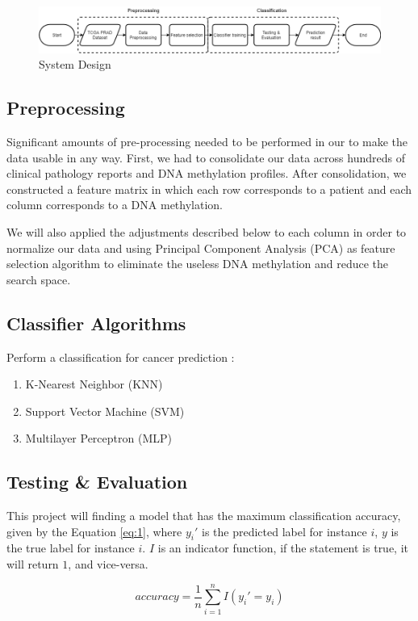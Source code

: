 \documentclass[a4paper,oneside]{article}
\begin{document}
\begin{figure}
  \includegraphics[width=0.9\linewidth]{system_design}
  \centering
  \caption{System Design}
  \label{fig:system_design}
\end{figure}

\subsection{Preprocessing}
Significant amounts of pre-processing needed to be performed in our to make the data usable in any way. First, we had to consolidate our data across hundreds of clinical pathology reports and DNA methylation profiles. After consolidation, we constructed a feature matrix in which each row corresponds to a patient and each column corresponds to a DNA methylation.
\par
We will also applied the adjustments described below to each column in order to normalize our data and using Principal Component Analysis (PCA) as feature selection algorithm to eliminate the useless DNA methylation and reduce the search space.
\subsection{Classifier Algorithms}

Perform a classification for cancer prediction :
\begin{enumerate}
\item K-Nearest Neighbor (KNN)
\item Support Vector Machine (SVM)
\item Multilayer Perceptron (MLP)
\end{enumerate}

\subsection{Testing \& Evaluation}
This project will finding a model that has the maximum classification accuracy, given by the Equation \ref{eq:1}, where $y_{i}'$ is the predicted label for instance $i$, $y$ is the true label for instance $i$. $I$ is an indicator function, if the statement is true, it will return $1$, and vice-versa.

\begin{equation} \label{eq:1}
accuracy =  \frac{1}{n}  \sum_{i=1}^n  I(y_{i}' = y_{i})
\end{equation}
\end{document}
